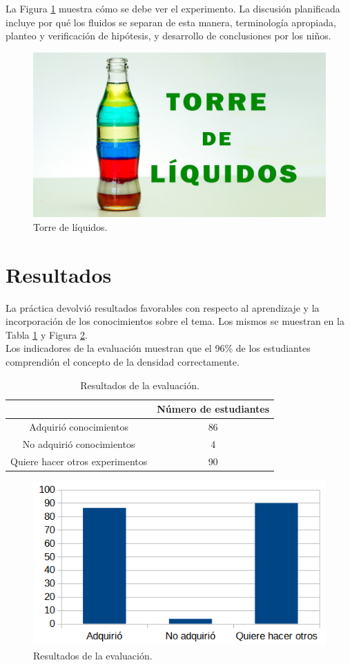 \documentclass{article}
\begin{document}
La Figura \ref{fig:botella} muestra cómo se debe ver el experimento. La discusión planificada incluye por qué los fluidos se separan de esta manera, terminología apropiada, planteo y verificación de hipótesis, y desarrollo de conclusiones por los niños. 
\begin{figure}[ht]
    \centering    \includegraphics[width=0.6\linewidth]{exp_torre_de_liquidosjpg.jpg}
    \caption{Torre de líquidos.}
    \label{fig:botella}
\end{figure}



\section{Resultados}

La práctica devolvió resultados favorables con respecto al aprendizaje y la incorporación de los conocimientos sobre el tema. Los mismos se muestran en la Tabla \ref{tab:resultados} y Figura \ref{fig:evaluacion}.\\

Los indicadores de la evaluación muestran que el 96\% de los estudiantes comprendión el concepto de la densidad correctamente.\\

\begin{table}[ht]
    \centering
    \begin{tabular}{|c|c|}
    \hline
         & Número de estudiantes \\
         \hline
        Adquirió conocimientos & 86 \\
        No adquirió conocimientos & 4 \\
        Quiere hacer otros experimentos & 90 \\
        \hline
    \end{tabular}
    \caption{Resultados de la evaluación.}
    \label{tab:resultados}
\end{table}

\begin{figure}[ht]
    \centering
    \includegraphics[width=0.6\linewidth]{Grafica.png}
    \caption{Resultados de la evaluación.}
    \label{fig:evaluacion}
\end{figure}
\end{document}
